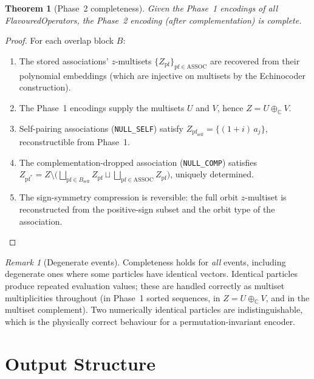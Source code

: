 \documentclass[11pt,a4paper]{article}
\theoremstyle{definition}
\theoremstyle{plain}
\newtheorem{theorem}[definition]{Theorem}
\theoremstyle{remark}
\newtheorem{remark}[definition]{Remark}
\newcommand{\C}{\mathbb{C}}
\newcommand{\pf}{\mathrm{pf}}
\begin{document}
\begin{theorem}[Phase~2 completeness]
Given the Phase~1 encodings of all FlavouredOperators, the Phase~2 encoding
(after complementation) is complete.
\end{theorem}
\begin{proof}
For each overlap block $B$:
\begin{enumerate}
  \item The stored associations' $z$-multisets $\{Z_\pf\}_{\pf \in \mathrm{ASSOC}}$
    are recovered from their polynomial embeddings (which are injective on
    multisets by the Echinocoder construction).
  \item The Phase~1 encodings supply the multisets $U$ and $V$, hence $Z = U
    \oplus_\C V$.
  \item Self-pairing associations (\texttt{NULL\_SELF}) satisfy
    $Z_{\pf_\mathrm{self}} = \{(1+i)\,a_j\}$, reconstructible from Phase~1.
  \item The complementation-dropped association (\texttt{NULL\_COMP}) satisfies
    $Z_{\pf^*} = Z \setminus \bigl(\bigsqcup_{\pf \in B_\mathrm{self}} Z_\pf
    \sqcup \bigsqcup_{\pf \in \mathrm{ASSOC}} Z_\pf\bigr)$, uniquely determined.
  \item The sign-symmetry compression is reversible: the full orbit
    $z$-multiset is reconstructed from the positive-sign subset and the
    orbit type of the association.
\end{enumerate}
\end{proof}

\begin{remark}[Degenerate events]
Completeness holds for \emph{all} events, including degenerate ones where some
particles have identical vectors.  Identical particles produce repeated
evaluation values; these are handled correctly as multiset multiplicities
throughout (in Phase~1 sorted sequences, in $Z = U \oplus_\C V$, and in the
multiset complement).  Two numerically identical particles are indistinguishable,
which is the physically correct behaviour for a permutation-invariant encoder.
\end{remark}

\section{Output Structure}
\end{document}
